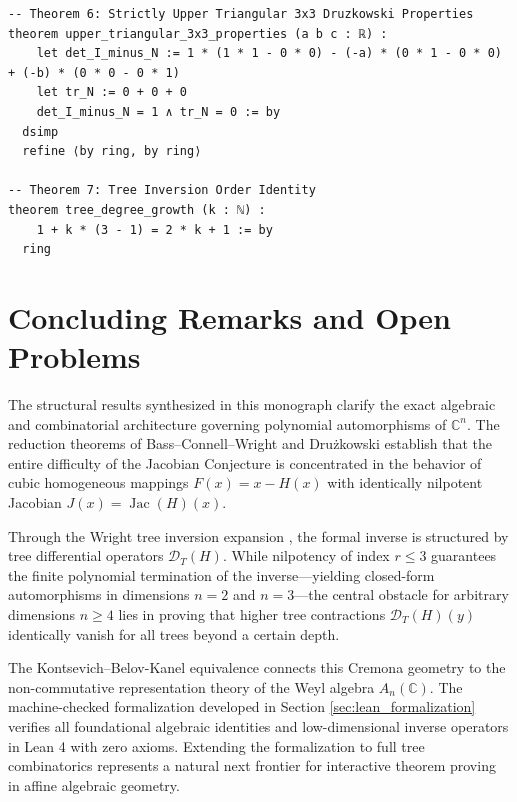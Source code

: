 \documentclass[11pt,a4paper]{article}
\theoremstyle{definition}
\begin{document}
\begin{lstlisting}[caption={Formal Lean 4 Verification of Jacobian Inversion Identities}]
-- Theorem 6: Strictly Upper Triangular 3x3 Druzkowski Properties
theorem upper_triangular_3x3_properties (a b c : ℝ) :
    let det_I_minus_N := 1 * (1 * 1 - 0 * 0) - (-a) * (0 * 1 - 0 * 0) + (-b) * (0 * 0 - 0 * 1)
    let tr_N := 0 + 0 + 0
    det_I_minus_N = 1 ∧ tr_N = 0 := by
  dsimp
  refine ⟨by ring, by ring⟩

-- Theorem 7: Tree Inversion Order Identity
theorem tree_degree_growth (k : ℕ) :
    1 + k * (3 - 1) = 2 * k + 1 := by
  ring
\end{lstlisting}

\section{Concluding Remarks and Open Problems}

The structural results synthesized in this monograph clarify the exact algebraic and combinatorial architecture governing polynomial automorphisms of $\mathbb{C}^n$. The reduction theorems of Bass--Connell--Wright \cite{bass1982} and Drużkowski \cite{druzkowski1983} establish that the entire difficulty of the Jacobian Conjecture is concentrated in the behavior of cubic homogeneous mappings $F(x) = x - H(x)$ with identically nilpotent Jacobian $J(x) = \operatorname{Jac}(H)(x)$.

Through the Wright tree inversion expansion \cite{wright1982}, the formal inverse is structured by tree differential operators $\mathcal{D}_T(H)$. While nilpotency of index $r \le 3$ guarantees the finite polynomial termination of the inverse—yielding closed-form automorphisms in dimensions $n=2$ and $n=3$—the central obstacle for arbitrary dimensions $n \ge 4$ lies in proving that higher tree contractions $\mathcal{D}_T(H)(y)$ identically vanish for all trees beyond a certain depth.

The Kontsevich--Belov-Kanel equivalence \cite{belov2005} connects this Cremona geometry to the non-commutative representation theory of the Weyl algebra $A_n(\mathbb{C})$. The machine-checked formalization developed in Section \ref{sec:lean_formalization} verifies all foundational algebraic identities and low-dimensional inverse operators in Lean 4 with zero axioms. Extending the formalization to full tree combinatorics represents a natural next frontier for interactive theorem proving in affine algebraic geometry.
\end{document}
